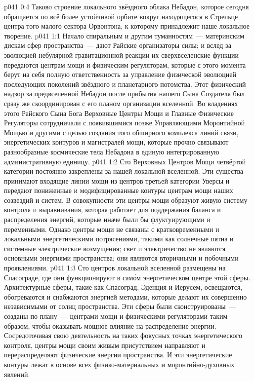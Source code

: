 \vs p041 0:4 Таково строение локального звёздного облака Небадон, которое сегодня обращается по всё более устойчивой орбите вокруг находящегося в Стрельце центра того малого сектора Орвонтона, к которому принадлежит наше локальное творение.
\vs p041 1:1 Начало спиральным и другим туманностям~--- материнским дискам сфер пространства~--- дают Райские организаторы силы; и вслед за эволюцией небулярной гравитационной реакции их сверхвселенские функции передаются центрам мощи и физическим регуляторам, которые с этого момента берут на себя полную ответственность за управление физической эволюцией последующих поколений звёздного и планетарного потомства. Этот физический надзор за предвселенной Небадон после прибытия нашего Сына Создателя был сразу же скоординирован с его планом организации вселенной. Во владениях этого Райского Сына Бога Верховные Центры Мощи и Главные Физические Регуляторы сотрудничали с появившимися позже Управляющими Моронтийной Мощью и другими с целью создания того обширного комплекса линий связи, энергетических контуров и магистралей мощи, которые прочно связывают разнообразные космические тела Небадона в единую интегрированную административную единицу.
\vs p041 1:2 Сто Верховных Центров Мощи четвёртой категории постоянно закреплены за нашей локальной вселенной. Эти существа принимают входящие линии мощи из центров третьей категории Уверсы и передают пониженные и модифицированные контуры центрам мощи наших созвездий и систем. В совокупности эти центры мощи образуют живую систему контроля и выравнивания, которая работает для поддержания баланса и распределения энергий, которые иначе были бы флуктуирующими и переменными. Однако центры мощи не связаны с кратковременными и локальными энергетическими потрясениями, такими как солнечные пятна и системные электрические возмущения; свет и электричество не являются основными энергиями пространства; они являются вторичными и побочными проявлениями.
\vs p041 1:3 Сто центров локальной вселенной размещены на Спасограде, где они функционируют в сам\'ом энергетическом центре этой сферы. Архитектурные сферы, такие как Спасоград, Эденция и Иерусем, освещаются, обогреваются и снабжаются энергией методами, которые делают их совершенно независимыми от солнц пространства. Эти сферы были сконструированы~--- созданы по плану~--- центрами мощи и физическими регуляторами таким образом, чтобы оказывать мощное влияние на распределение энергии. Сосредоточивая свою деятельность на таких фокусных точках энергетического контроля, центры мощи своим живым присутствием направляют и перераспределяют физические энергии пространства. И эти энергетические контуры лежат в основе всех физико\hyp{}материальных и моронтийно\hyp{}духовных явлений.
